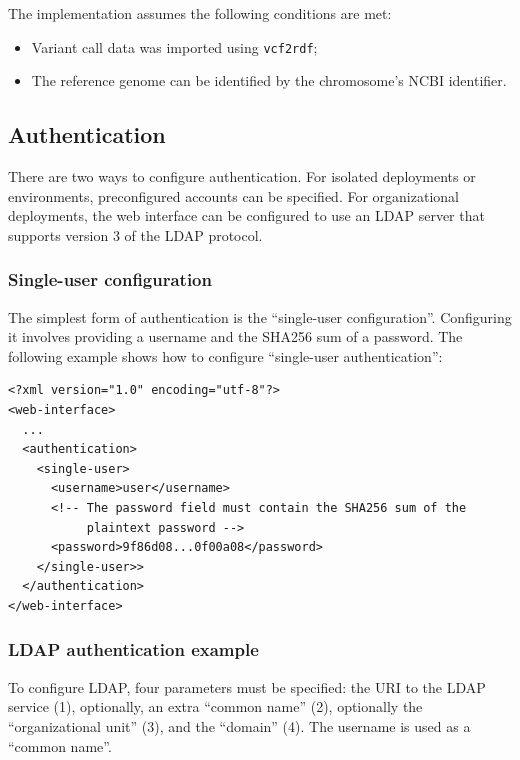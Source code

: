   The implementation assumes the following conditions are met:
  \begin{itemize}
  \item Variant call data was imported using \texttt{vcf2rdf};
  \item The reference genome can be identified by the chromosome's NCBI
    identifier.
  \end{itemize}

\subsection{Authentication}
\label{sec:authentication}

  There are two ways to configure authentication.  For isolated deployments
  or environments, preconfigured accounts can be specified.  For organizational
  deployments, the web interface can be configured to use an LDAP server that
  supports version 3 of the LDAP protocol.

\subsubsection{Single-user configuration}

  The simplest form of authentication is the ``single-user configuration''.
  Configuring it involves providing a username and the SHA256 sum of a password.
  The following example shows how to configure ``single-user authentication'':

\begin{siderules}
\begin{verbatim}
<?xml version="1.0" encoding="utf-8"?>
<web-interface>
  ...
  <authentication>
    <single-user>
      <username>user</username>
      <!-- The password field must contain the SHA256 sum of the
           plaintext password -->
      <password>9f86d08...0f00a08</password>
    </single-user>>
  </authentication>
</web-interface>
\end{verbatim}
\end{siderules}

\subsubsection{LDAP authentication example}

  To configure LDAP, four parameters must be specified: the URI to the LDAP
  service (1), optionally, an extra ``common name'' (2), optionally the
  ``organizational unit'' (3), and the ``domain'' (4).  The username is used
  as a ``common name''.

